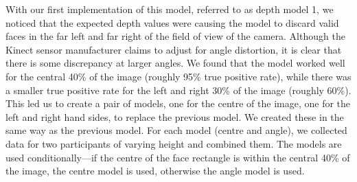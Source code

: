 \documentclass[conference]{IEEEtran}
\begin{document}
With our first implementation of this model, referred to as depth model 1, we noticed that the expected depth values were causing the model to discard valid faces in the far left and far right of the field of view of the camera. Although the Kinect sensor manufacturer claims to adjust for angle distortion, it is clear that there is some discrepancy at larger angles. We found that the model worked well for the central 40\% of the image (roughly 95\% true positive rate), while there was a smaller true positive rate for the left and right 30\% of the image (roughly 60\%). This led us to create a pair of models, one for the centre of the image, one for the left and right hand sides, to replace the previous model. We created these in the same way as the previous model. For each model (centre and angle), we collected data for two participants of varying height and combined them. The models are used conditionally---if the centre of the face rectangle is within the central 40\% of the image, the centre model is used, otherwise the angle model is used.
\end{document}
